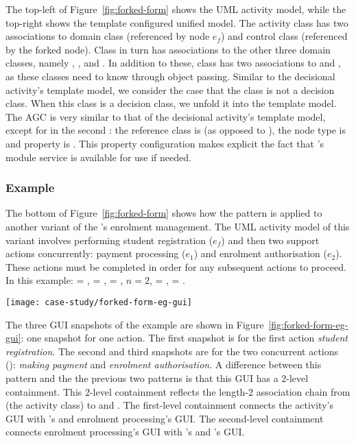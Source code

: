 The top-left of Figure~\ref{fig:forked-form} shows the UML activity model, while the top-right shows the template configured unified model. The activity class  has two associations to domain class  (referenced by node $ e_f $) and control class  (referenced by the forked node). Class  in turn has associations to the other three domain classes, namely , , and . In addition to these, class  has two associations to  and , as these classes need to know  through object passing.
%
Similar to the decisional activity's template model, we consider the case that the class  is not a decision class. When this class is a decision class, we unfold it into the template model.
%
The AGC is very similar to that of the decisional activity's template model, except for in the second : the reference class is  (as opposed to ), the node type is  and property  is . This property configuration makes explicit the fact that 's module service is available for use if needed.

\subsubsection*{Example}
The bottom of Figure~\ref{fig:forked-form} shows how the pattern is applied to another variant of the \courseman's enrolment management. The UML activity model of this variant involves performing student registration ($ e_f $) and then two support actions concurrently: payment processing ($ e_1 $) and enrolment authorisation ($ e_2 $). These actions must be completed in order for any subsequent actions to proceed.
%
In this example:  = ,  = ,  = , $ n = 2 $,  = ,  = .


\begin{figure*}
	\begin{center}
		\texttt{[image: case-study/forked-form-eg-gui]}
	\end{center}
	\caption{The forked pattern form view of enrolment management activity.} %
	\label{fig:forked-form-eg-gui}
\end{figure*}

The three GUI snapshots of the example are shown in Figure~\ref{fig:forked-form-eg-gui}: one snapshot for one action. The first snapshot is for the first action \textit{student registration}. The second and third snapshots are for the two concurrent actions (\resp): \textit{making payment} and \textit{enrolment authorisation}. A difference between this pattern and the the previous two patterns is that this GUI has a 2-level containment. This 2-level containment reflects the length-2 association chain from  (the activity class) to  and . The first-level containment connects the activity's GUI with 's and enrolment processing's GUI. The second-level containment connects enrolment processing's GUI with 's and 's GUI.

